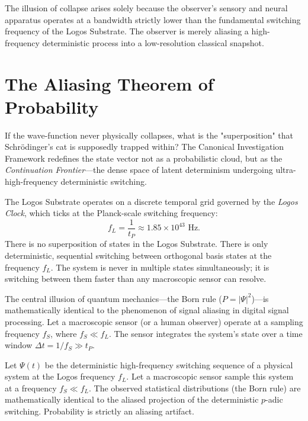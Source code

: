 \documentclass[12pt,twoside]{extbook}
\theoremstyle{definition}
\theoremstyle{remark}
\begin{document}
The illusion of collapse arises solely because the observer’s sensory and neural apparatus operates at a bandwidth strictly lower than the fundamental switching frequency of the Logos Substrate. The observer is merely aliasing a high-frequency deterministic process into a low-resolution classical snapshot.

\section{The Aliasing Theorem of Probability}
If the wave-function never physically collapses, what is the "superposition" that Schrödinger’s cat is supposedly trapped within? The Canonical Investigation Framework redefines the state vector not as a probabilistic cloud, but as the \textit{Continuation Frontier}—the dense space of latent determinism undergoing ultra-high-frequency deterministic switching.

The Logos Substrate operates on a discrete temporal grid governed by the \textit{Logos Clock}, which ticks at the Planck-scale switching frequency:
\begin{equation}
f_L = \frac{1}{t_P} \approx 1.85 \times 10^{43} \text{ Hz}.
\end{equation}
There is no superposition of states in the Logos Substrate. There is only deterministic, sequential switching between orthogonal basis states at the frequency $f_L$. The system is never in multiple states simultaneously; it is switching between them faster than any macroscopic sensor can resolve.

The central illusion of quantum mechanics—the Born rule ($P = |\Psi|^2$)—is mathematically identical to the phenomenon of signal aliasing in digital signal processing. Let a macroscopic sensor (or a human observer) operate at a sampling frequency $f_S$, where $f_S \ll f_L$. The sensor integrates the system's state over a time window $\Delta t = 1/f_S \gg t_P$.

\begin{theorem}
Let $\Psi(t)$ be the deterministic high-frequency switching sequence of a physical system at the Logos frequency $f_L$. Let a macroscopic sensor sample this system at a frequency $f_S \ll f_L$. The observed statistical distributions (the Born rule) are mathematically identical to the aliased projection of the deterministic $p$-adic switching. Probability is strictly an aliasing artifact.
\end{theorem}
\end{document}

